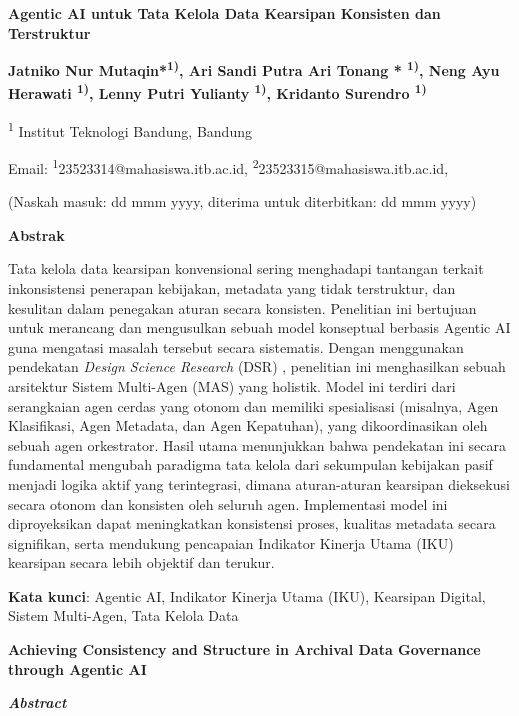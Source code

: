 \textbf{Agentic AI untuk Tata Kelola Data Kearsipan Konsisten dan
Terstruktur}

\textbf{Jatniko Nur Mutaqin*\textsuperscript{1)}, Ari Sandi Putra Ari
Tonang * \textsuperscript{1)}, Neng Ayu Herawati \textsuperscript{1)},
Lenny Putri Yulianty \textsuperscript{1)}, Kridanto Surendro
\textsuperscript{1)}}

\textsuperscript{1} Institut Teknologi Bandung, Bandung

Email: \textsuperscript{1}23523314@mahasiswa.itb.ac.id,
\textsuperscript{2}23523315@mahasiswa.itb.ac.id,

(Naskah masuk: dd mmm yyyy, diterima untuk diterbitkan: dd mmm yyyy)

\textbf{Abstrak}

Tata kelola data kearsipan konvensional sering menghadapi tantangan
terkait inkonsistensi penerapan kebijakan, metadata yang tidak
terstruktur, dan kesulitan dalam penegakan aturan secara konsisten.
Penelitian ini bertujuan untuk merancang dan mengusulkan sebuah model
konseptual berbasis Agentic AI guna mengatasi masalah tersebut secara
sistematis. Dengan menggunakan pendekatan \emph{Design Science Research}
(DSR) , penelitian ini menghasilkan sebuah arsitektur Sistem Multi-Agen
(MAS) yang holistik. Model ini terdiri dari serangkaian agen cerdas yang
otonom dan memiliki spesialisasi (misalnya, Agen Klasifikasi, Agen
Metadata, dan Agen Kepatuhan), yang dikoordinasikan oleh sebuah agen
orkestrator. Hasil utama menunjukkan bahwa pendekatan ini secara
fundamental mengubah paradigma tata kelola dari sekumpulan kebijakan
pasif menjadi logika aktif yang terintegrasi, dimana aturan-aturan
kearsipan dieksekusi secara otonom dan konsisten oleh seluruh agen.
Implementasi model ini diproyeksikan dapat meningkatkan konsistensi
proses, kualitas metadata secara signifikan, serta mendukung pencapaian
Indikator Kinerja Utama (IKU) kearsipan secara lebih objektif dan
terukur.

\textbf{Kata kunci}: Agentic AI, Indikator Kinerja Utama (IKU),
Kearsipan Digital, Sistem Multi-Agen, Tata Kelola Data

\textbf{Achieving Consistency and Structure in Archival Data Governance
through Agentic AI}

\emph{\textbf{Abstract}}

